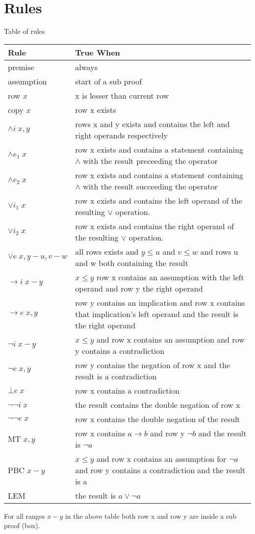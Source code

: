 \documentclass[a4paper,11pt]{article}
\begin{document}
\section{Rules}
\label{sec:Rules}
Table of rules
\begin{center}
    \begin{longtable}{ l p{10cm}}
    \hline
    \textbf{Rule} & \textbf{True When}\\ \hline
    premise & always \\ \hline
    assumption & start of a sub proof \\ \hline
    row $x$ & x is lesser than current row \\ \hline
    copy $x$ & row x exists \\ \hline
    $\land i \; x,y$ & rows x and y exists and contains the left and right operands respectively \\ \hline
    $\land e_1 \; x$ & row x exists and contains a statement containing $\land$ with the result preceeding the operator \\ \hline
	$\land e_2 \; x$ & row x exists and contains a statement containing $\land$ with the result succeeding the operator \\ \hline
	$\lor i_1 \; x$ & row x exists and contains the left operand of the resulting $\lor$ operation. \\ \hline
	$\lor i_2 \; x$ & row x exists and contains the right operand of the resulting $\lor$ operation. \\ \hline
	$\lor e \; x,y-u,v-w$ & all rows exists and $y \leq u$ and $v \leq w$ and rows u and w both containing the result \\ \hline
	$\to i \; x-y$ & $x \leq y$ row x contains an assumption with the left operand and row y the right operand \\ \hline
	$\to e \; x,y$ & row y contains an implication and row x contains that implication's left operand and the result is the right operand \\ \hline
	$\neg i \; x-y$ & $x \leq y$ and row x contains an assumption and row y contains a contradiction \\ \hline
	$\neg e \; x,y$ & row y contains the negation of row x and the result is a contradiction \\ \hline
	$\bot e \; x$ & row x contains a contradiction \\ \hline
	$\neg \neg i \; x$ & the result contains the double negation of row x \\ \hline
	$\neg \neg e \; x$ & row x contains the double negation of the result \\ \hline
	MT $x,y$ & row x contains $a \to b$ and row y $\neg b$ and the result is $\neg a$ \\ \hline
	PBC $x-y$ & $x \leq y$ and row x contains an assumption for $\neg a$ and row y contains a contradiction and the result is a \\ \hline
	LEM & the result is $a \lor \neg a$ \\ \hline
    \end{longtable}
\end{center}
For all ranges $x-y$ in the above table both row x and row y are inside a sub proof (box).
\end{document}

